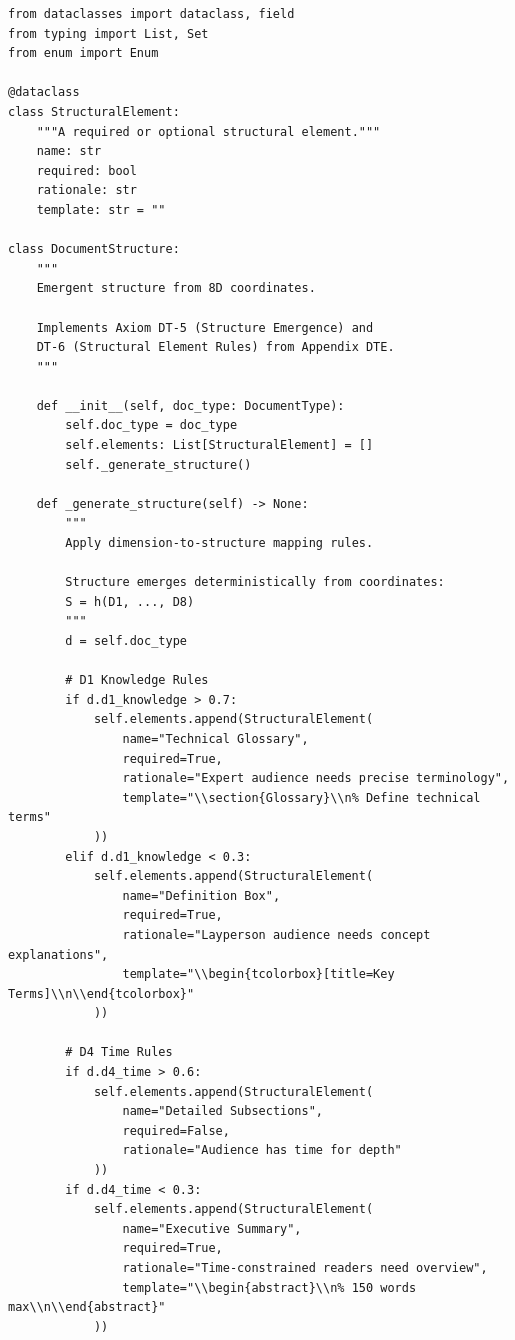 \begin{verbatim}
from dataclasses import dataclass, field
from typing import List, Set
from enum import Enum

@dataclass
class StructuralElement:
    """A required or optional structural element."""
    name: str
    required: bool
    rationale: str
    template: str = ""

class DocumentStructure:
    """
    Emergent structure from 8D coordinates.

    Implements Axiom DT-5 (Structure Emergence) and
    DT-6 (Structural Element Rules) from Appendix DTE.
    """

    def __init__(self, doc_type: DocumentType):
        self.doc_type = doc_type
        self.elements: List[StructuralElement] = []
        self._generate_structure()

    def _generate_structure(self) -> None:
        """
        Apply dimension-to-structure mapping rules.

        Structure emerges deterministically from coordinates:
        S = h(D1, ..., D8)
        """
        d = self.doc_type

        # D1 Knowledge Rules
        if d.d1_knowledge > 0.7:
            self.elements.append(StructuralElement(
                name="Technical Glossary",
                required=True,
                rationale="Expert audience needs precise terminology",
                template="\\section{Glossary}\\n% Define technical terms"
            ))
        elif d.d1_knowledge < 0.3:
            self.elements.append(StructuralElement(
                name="Definition Box",
                required=True,
                rationale="Layperson audience needs concept explanations",
                template="\\begin{tcolorbox}[title=Key Terms]\\n\\end{tcolorbox}"
            ))

        # D4 Time Rules
        if d.d4_time > 0.6:
            self.elements.append(StructuralElement(
                name="Detailed Subsections",
                required=False,
                rationale="Audience has time for depth"
            ))
        if d.d4_time < 0.3:
            self.elements.append(StructuralElement(
                name="Executive Summary",
                required=True,
                rationale="Time-constrained readers need overview",
                template="\\begin{abstract}\\n% 150 words max\\n\\end{abstract}"
            ))


\end{verbatim}
